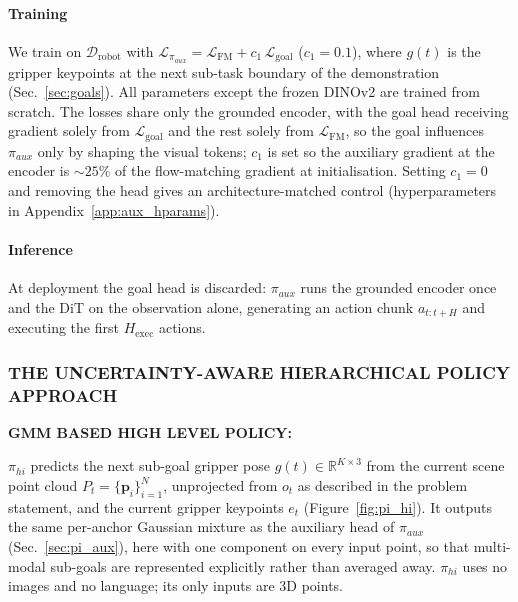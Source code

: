 \documentclass[letterpaper, 10 pt, conference]{ieeeconf}  %
\begin{document}
\paragraph{\textbf{Training}}
We train on $\mathcal{D}_{\text{robot}}$ with
$\mathcal{L}_{\pi_{aux}} = \mathcal{L}_{\text{FM}} + c_1\,\mathcal{L}_{\text{goal}}$
($c_1{=}0.1$), where $g(t)$ is the gripper keypoints at the next sub-task
boundary of the demonstration (Sec.~\ref{sec:goals}). All parameters except the
frozen DINOv2 are trained from scratch. The losses share only the grounded
encoder, with the goal head receiving gradient solely from
$\mathcal{L}_{\text{goal}}$ and the rest solely from
$\mathcal{L}_{\text{FM}}$, so the goal influences $\pi_{aux}$ only by shaping
the visual tokens; $c_1$ is set so the auxiliary gradient at the encoder is
${\sim}25\%$ of the flow-matching gradient at initialisation. Setting $c_1{=}0$
and removing the head gives an architecture-matched control
(hyperparameters in Appendix~\ref{app:aux_hparams}).

\paragraph{\textbf{Inference}}
At deployment the goal head is discarded: $\pi_{aux}$ runs the grounded encoder
once and the DiT on the observation alone, generating an action chunk $a_{t:t+H}$ and executing the first $H_{\text{exec}}$ actions.


\subsubsection{THE UNCERTAINTY-AWARE HIERARCHICAL POLICY APPROACH}

\textbf{GMM BASED HIGH LEVEL POLICY:} 

$\pi_{hi}$ predicts the next sub-goal gripper pose $g(t)\in\mathbb{R}^{K\times 3}$ from the
current scene point cloud $P_t=\{\mathbf{p}_i\}_{i=1}^{N}$, unprojected from $o_t$ as described in
the problem statement, and the current gripper keypoints $e_t$ (Figure~\ref{fig:pi_hi}). It outputs the same
per-anchor Gaussian mixture as the auxiliary head of $\pi_{aux}$
(Sec.~\ref{sec:pi_aux}), here with one component on every input point, so that
multi-modal sub-goals are represented explicitly rather than averaged away.
$\pi_{hi}$ uses no images and no language; its only inputs are 3D points.
\end{document}
